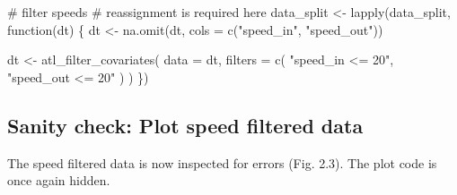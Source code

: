\documentclass[]{scrreprt}
\newenvironment{Shaded}{}{}
\newcommand{\CommentTok}[1]{\textcolor[rgb]{0.00,0.50,0.00}{#1}}
\newcommand{\ControlFlowTok}[1]{\textcolor[rgb]{0.00,0.00,1.00}{#1}}
\newcommand{\DataTypeTok}[1]{#1}
\newcommand{\KeywordTok}[1]{\textcolor[rgb]{0.00,0.00,1.00}{#1}}
\newcommand{\NormalTok}[1]{#1}
\newcommand{\StringTok}[1]{\textcolor[rgb]{0.00,0.50,0.50}{#1}}
\begin{document}
\begin{Shaded}
\begin{Highlighting}[]
\CommentTok{# filter speeds}
\CommentTok{# reassignment is required here}
\NormalTok{data_split <-}\StringTok{ }\KeywordTok{lapply}\NormalTok{(data_split, }\ControlFlowTok{function}\NormalTok{(dt) \{}
\NormalTok{  dt <-}\StringTok{ }\KeywordTok{na.omit}\NormalTok{(dt, }\DataTypeTok{cols =} \KeywordTok{c}\NormalTok{(}\StringTok{"speed_in"}\NormalTok{, }\StringTok{"speed_out"}\NormalTok{))}

\NormalTok{  dt <-}\StringTok{ }\KeywordTok{atl_filter_covariates}\NormalTok{(}
    \DataTypeTok{data =}\NormalTok{ dt,}
    \DataTypeTok{filters =} \KeywordTok{c}\NormalTok{(}
      \StringTok{"speed_in <= 20"}\NormalTok{,}
      \StringTok{"speed_out <= 20"}
\NormalTok{    )}
\NormalTok{  )}
\NormalTok{\})}
\end{Highlighting}
\end{Shaded}

\hypertarget{sanity-check-plot-speed-filtered-data}{%
\subsection{Sanity check: Plot speed filtered data}\label{sanity-check-plot-speed-filtered-data}}

The speed filtered data is now inspected for errors (Fig. 2.3). The plot code is once again hidden.
\end{document}
